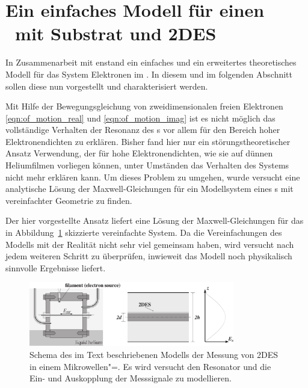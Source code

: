 
\section{Ein einfaches Modell für einen \HR\ mit Substrat und 2DES}
\label{sec:cavity_model}

In Zusammenarbeit mit  enstand ein einfaches und ein erweitertes theoretisches Modell für das System Elektronen im \HR. In diesem und im folgenden Abschnitt sollen diese nun vorgestellt und charakterisiert werden.

Mit Hilfe der Bewegungsgleichung von zweidimensionalen freien Elektronen \eqref{eqn:of_motion_real} und \eqref{eqn:of_motion_imag} ist es nicht möglich das vollständige Verhalten der Resonanz des \HR{}s vor allem für den Bereich hoher Elektronendichten zu erklären. Bisher fand hier nur ein störungstheoretischer Ansatz Verwendung, der für hohe Elektronendichten, wie sie auf dünnen Heliumfilmen vorliegen können, unter Umständen das Verhalten des Systems nicht mehr erklären kann. Um dieses Problem zu umgehen, wurde versucht eine analytische Lösung der Maxwell-Gleichungen für ein Modellsystem eines \HR{}s mit vereinfachter Geometrie zu finden.

Der hier vorgestellte Ansatz liefert eine Lösung der Maxwell-Gleichungen für das in Abbildung~\ref{fig:resshift_schema} skizzierte vereinfachte System. Da die Vereinfachungen des Modells mit der Realität nicht sehr viel gemeinsam haben, wird versucht nach jedem weiteren Schritt zu überprüfen, inwieweit das Modell noch physikalisch sinnvolle Ergebnisse liefert.

\begin{figure}[h!tbp]
	\centerline{\includegraphics[width=0.8\textwidth]{theo_cavity/schema}}
	\caption[Vereinfachtes Resonatormodell]{Schema des im Text beschriebenen Modells der Messung von 2DES in einem Mikrowellen"=\HR. Es wird versucht den Resonator und die Ein- und Auskopplung der Messsignale zu modellieren. 
}
	\label{fig:resshift_schema}
\end{figure}

